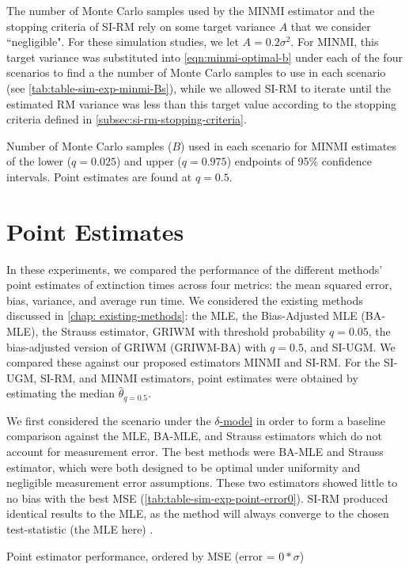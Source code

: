 The number of Monte Carlo samples used by the MINMI estimator and the stopping criteria of SI-RM rely on some target variance $A$ that we consider ``negligible". For these simulation studies, we let $A = 0.2\sigma^2$. For MINMI, this target variance was substituted into \autoref{eqn:minmi-optimal-b} under each of the four scenarios to find a the number of Monte Carlo samples to use in each scenario (see \autoref{tab:table-sim-exp-minmi-Bs}), while we allowed SI-RM to iterate until the estimated RM variance was less than this target value according to the stopping criteria defined in \autoref{subsec:si-rm-stopping-criteria}.
\begin{table}[ht]
    \centering
    \caption{Number of Monte Carlo samples ($B$) used in each scenario for MINMI estimates of the lower ($q=0.025$) and upper ($q=0.975$) endpoints of 95\% confidence intervals. Point estimates are found at $q = 0.5$.}
    \vspace{4mm}
    
    \label{tab:table-sim-exp-minmi-Bs}
    \vspace{-4mm}
\end{table}

\section{Point Estimates}

In these experiments, we compared the performance of the different methods' point estimates of extinction times across four metrics: the mean squared error, bias, variance, and average run time. We considered the existing methods discussed in \autoref{chap: existing-methods}: the MLE, the Bias-Adjusted MLE (BA-MLE), the Strauss estimator, GRIWM with threshold probability $q=0.05$, the bias-adjusted version of GRIWM (GRIWM-BA) with $q=0.5$, and SI-UGM. We compared these against our proposed estimators MINMI and SI-RM. For the SI-UGM, SI-RM, and MINMI estimators, point estimates were obtained by estimating the median $\hat\theta_{q=0.5}$.

We first considered the scenario under the \hyperref[model: no-measurement-error]{$\delta$-model} in order to form a baseline comparison against the MLE, BA-MLE, and Strauss estimators which do not account for measurement error. The best methods were BA-MLE and Strauss estimator, which were both designed to be optimal under uniformity and negligible measurement error assumptions. These two estimators showed little to no bias with the best MSE (\autoref{tab:table-sim-exp-point-error0}). SI-RM produced identical results to the MLE, as the method will always converge to the chosen test-statistic (the MLE here) \cite{Garthwaite1992}.
\begin{table}[ht]
    \centering
    \caption{Point estimator performance, ordered by MSE (error = $0*\sigma$)}
    
    \label{tab:table-sim-exp-point-error0}
\end{table}

